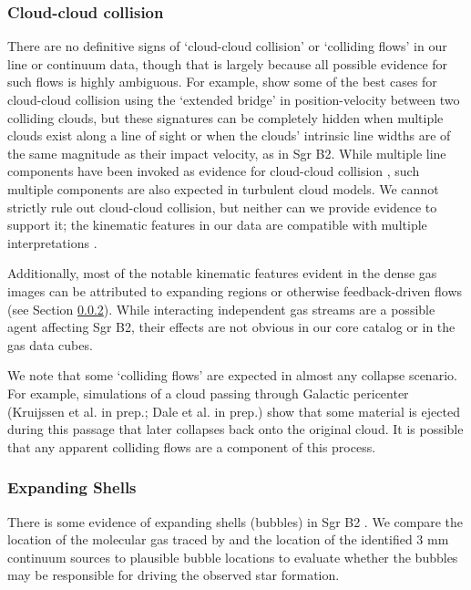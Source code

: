 \documentclass[twocolumn]{aastex61}
\begin{document}
\subsubsection{Cloud-cloud collision}
\label{sec:ccc}
There are no definitive signs of `cloud-cloud collision' or `colliding flows'
in our line or continuum data, though that is largely because all possible
evidence for such flows is highly ambiguous. For example, \citet{Haworth2015c}
show some of the best cases for cloud-cloud collision using the `extended bridge'
in position-velocity between two colliding clouds, but these signatures can be 
completely hidden when multiple clouds exist along a line of sight or when
the clouds' intrinsic line widths are of the same magnitude as their impact velocity,
as in Sgr B2.  While multiple line components have been invoked as evidence
for cloud-cloud collision \citep{Hasegawa1994a,Corby2015a}, such multiple
components are also expected in turbulent cloud models.
We cannot strictly rule out cloud-cloud collision, but neither
can we provide evidence to support it; the kinematic features in our data are
compatible with multiple interpretations \citep[see also][who argued
that the multiple components cited as cloud-cloud collision evidence
could also be produced by opacity effects]{Henshaw2016a}.

Additionally, most of the notable kinematic features evident in the dense gas
images can be attributed to expanding \hii regions or otherwise feedback-driven
flows (see Section \ref{sec:expandingshells}).  While interacting independent
gas streams are a possible agent affecting Sgr B2, their effects are not
obvious in our core catalog or in the gas data cubes.

We note that some `colliding flows' are expected in almost any collapse
scenario.  For example, simulations of a cloud passing through Galactic
pericenter (Kruijssen et al. in prep.; Dale et al. in prep.) show that some
material is ejected during this passage that later collapses back onto the
original cloud.  It is possible that any apparent colliding flows
\citep[e.g.,][]{Sato2000a} are a component of this process.

\subsubsection{Expanding Shells}
\label{sec:expandingshells}
There is some evidence of expanding shells (bubbles) in Sgr B2
\citep{de-Vicente1997a,Martin-Pintado1999a}.  We compare the location of the
molecular gas traced by \cyanoacetylene and the location of the identified 3 mm
continuum sources to plausible bubble locations to evaluate whether the bubbles
may be responsible for driving the observed star formation.
\end{document}
